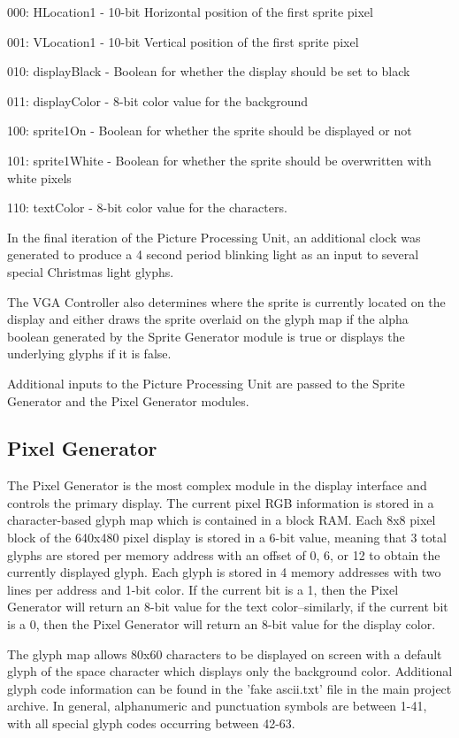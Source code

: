 \documentclass[letterpaper, 11 pt, conference]{article}
\begin{document}
000: HLocation1 - 10-bit Horizontal position of the first sprite pixel

001: VLocation1 - 10-bit Vertical position of the first sprite pixel

010: displayBlack - Boolean for whether the display should be set to black

011: displayColor - 8-bit color value for the background

100: sprite1On - Boolean for whether the sprite should be displayed or not

101: sprite1White - Boolean for whether the sprite should be overwritten with white pixels

110: textColor - 8-bit color value for the characters.

In the final iteration of the Picture Processing Unit, an additional clock was generated to produce a 4 second period blinking light as an input to several special Christmas light glyphs.

The VGA Controller also determines where the sprite is currently located on the display and either draws the sprite overlaid on the glyph map if the alpha boolean generated by the Sprite Generator module is true or displays the underlying glyphs if it is false.

Additional inputs to the Picture Processing Unit are passed to the Sprite Generator and the Pixel Generator modules.

\subsection{Pixel Generator}

The Pixel Generator is the most complex module in the display interface and controls the primary display.  The current pixel RGB information is stored in a character-based glyph map which is contained in a block RAM.  Each 8x8 pixel block of the 640x480 pixel display is stored in a 6-bit value, meaning that 3 total glyphs are stored per memory address with an offset of 0, 6, or 12 to obtain the currently displayed glyph.  Each glyph is stored in 4 memory addresses with two lines per address and 1-bit color.  If the current bit is a 1, then the Pixel Generator will return an 8-bit value for the text color--similarly, if the current bit is a 0, then the Pixel Generator will return an 8-bit value for the display color.

The glyph map allows 80x60 characters to be displayed on screen with a default glyph of the space character which displays only the background color.  Additional glyph code information can be found in the 'fake ascii.txt' file in the main project archive.  In general, alphanumeric and punctuation symbols are between 1-41, with all special glyph codes occurring between 42-63.
\end{document}
